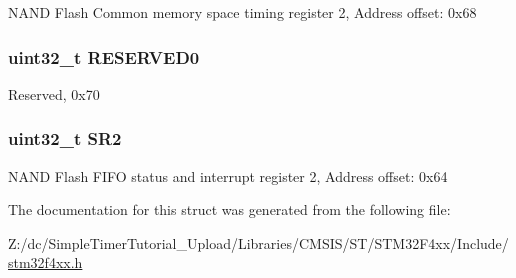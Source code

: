 N\-A\-N\-D Flash Common memory space timing register 2, Address offset\-: 0x68 \hypertarget{struct_f_s_m_c___bank2___type_def_af86c61a5d38a4fc9cef942a12744486b}{
\subsubsection[{R\-E\-S\-E\-R\-V\-E\-D0}]{\setlength{\rightskip}{0pt plus 5cm}uint32\-\_\-t R\-E\-S\-E\-R\-V\-E\-D0}}\label{struct_f_s_m_c___bank2___type_def_af86c61a5d38a4fc9cef942a12744486b}
Reserved, 0x70 \hypertarget{struct_f_s_m_c___bank2___type_def_a89623ee198737b29dc0a803310605a83}{
\subsubsection[{S\-R2}]{ uint32\-\_\-t S\-R2}}\label{struct_f_s_m_c___bank2___type_def_a89623ee198737b29dc0a803310605a83}
N\-A\-N\-D Flash F\-I\-F\-O status and interrupt register 2, Address offset\-: 0x64 

The documentation for this struct was generated from the following file\-:\begin{DoxyCompactItemize}
\item 
Z\-:/dc/\-Simple\-Timer\-Tutorial\-\_\-\-Upload/\-Libraries/\-C\-M\-S\-I\-S/\-S\-T/\-S\-T\-M32\-F4xx/\-Include/\hyperlink{stm32f4xx_8h}{stm32f4xx.\-h}\end{DoxyCompactItemize}

